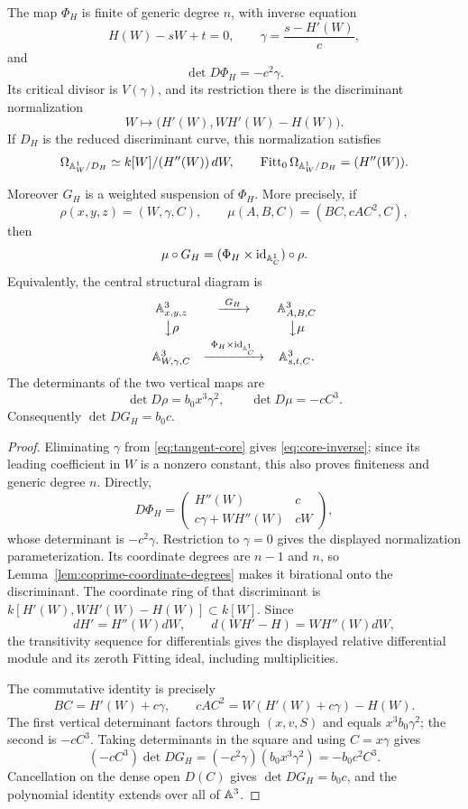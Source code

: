 \begin{theorem}\label{thm:tangent-core}
The map $\Phi_H$ is finite of generic degree $n$, with inverse equation
\begin{equation}\label{eq:core-inverse}
 H(W)-sW+t=0,\qquad \gamma=\frac{s-H'(W)}c,
\end{equation}
and
\[
 \det D\Phi_H=-c^2\gamma.
\]
Its critical divisor is $V(\gamma)$, and its restriction there is the
discriminant normalization
\[
 W\longmapsto\bigl(H'(W),WH'(W)-H(W)\bigr).
\]
If $D_H$ is the reduced discriminant curve, this normalization satisfies
\[
 \Omega_{\mathbb A^1_W/D_H}\simeq k[W]/(H''(W))\,dW,
 \qquad
 \operatorname{Fitt}_0\Omega_{\mathbb A^1_W/D_H}=(H''(W)).
\]

Moreover $G_H$ is a weighted suspension of $\Phi_H$.  More precisely, if
\[
 \rho(x,y,z)=(W,\gamma,C),\qquad
 \mu(A,B,C)=(BC,cAC^2,C),
\]
then
\[
 \mu\circ G_H=(\Phi_H\times\operatorname{id}_{\mathbb A^1_C})\circ\rho.
\]
Equivalently, the central structural diagram is
\[
 \begin{array}{ccc}
 \mathbb A^3_{x,y,z}&\xrightarrow{\ G_H\ }&\mathbb A^3_{A,B,C}\\[3pt]
 \big\downarrow{\rho}&&\big\downarrow{\mu}\\[3pt]
 \mathbb A^3_{W,\gamma,C}&
 \xrightarrow{\ \Phi_H\times\operatorname{id}_{\mathbb A^1_C}\ }&
 \mathbb A^3_{s,t,C}.
 \end{array}
\]
The determinants of the two vertical maps are
\[
 \det D\rho=b_0x^3\gamma^2,
 \qquad \det D\mu=-cC^3.
\]
Consequently $\det DG_H=b_0c$.
\end{theorem}

\begin{proof}
Eliminating $\gamma$ from \eqref{eq:tangent-core} gives
\eqref{eq:core-inverse}; since its leading coefficient in $W$ is a nonzero
constant, this also proves finiteness and generic degree $n$.  Directly,
\[
 D\Phi_H=
 \begin{pmatrix}
 H''(W)&c\\
 c\gamma+WH''(W)&cW
 \end{pmatrix},
\]
whose determinant is $-c^2\gamma$.  Restriction to $\gamma=0$ gives the
displayed normalization parameterization.  Its coordinate degrees are
$n-1$ and $n$, so Lemma~\ref{lem:coprime-coordinate-degrees} makes it
birational onto the discriminant.
The coordinate ring of that discriminant is
$k[H'(W),WH'(W)-H(W)]\subset k[W]$.  Since
\[
 dH'=H''(W)dW,\qquad d(WH'-H)=WH''(W)dW,
\]
the transitivity sequence for differentials gives the displayed relative
differential module and its zeroth Fitting ideal, including multiplicities.

The commutative identity is precisely
\[
 BC=H'(W)+c\gamma,\qquad
 cAC^2=W(H'(W)+c\gamma)-H(W).
\]
The first vertical determinant factors through $(x,v,S)$ and equals
$x^3b_0\gamma^2$; the second is $-cC^3$.  Taking determinants in the square
and using $C=x\gamma$ gives
\[
 (-cC^3)\det DG_H
 =(-c^2\gamma)(b_0x^3\gamma^2)
 =-b_0c^2C^3.
\]
Cancellation on the dense open $D(C)$ gives $\det DG_H=b_0c$, and the
polynomial identity extends over all of $\mathbb A^3$.
\end{proof}

